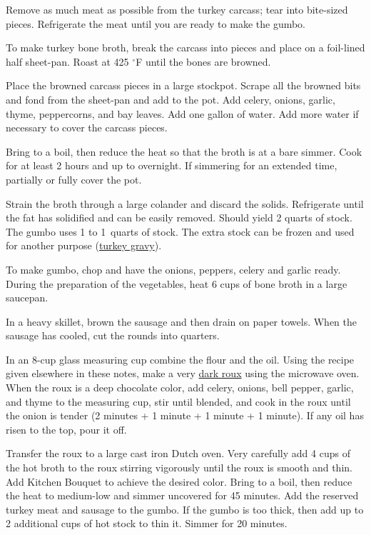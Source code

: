 \documentclass[letterpaper]{recipePMG}
\renewcommand{\deg}{$^\circ$}
\newcommand{\half}{\nicefrac{1}{2} \,}
\begin{document}
Remove as much meat as possible from the turkey carcass; tear into bite-sized pieces. Refrigerate the meat until you are ready to make the gumbo.

To make turkey bone broth, break the carcass into pieces and place on a foil-lined half sheet-pan. Roast at 425 \deg F until the bones are browned.

Place the browned carcass pieces in a large stockpot. Scrape all the browned bits and fond from the sheet-pan and add to the pot. Add celery, onions, garlic, thyme, peppercorns, and bay leaves. Add one gallon of water.  Add more water if necessary to cover the carcass pieces. 

Bring to a boil, then reduce the heat so that the broth is at a bare simmer. Cook for at least 2 hours and up to overnight. If simmering for an extended time, partially or fully cover the pot. 

Strain the broth through a large colander and discard the solids. Refrigerate until the fat has solidified and can be easily removed. Should yield 2 quarts of stock.  The gumbo uses 1 to 1\half quarts of stock. The extra stock can be frozen and used for another purpose (\hyperref[TurkeyGravy]{turkey gravy}).

To make gumbo, chop and have the onions, peppers, celery and garlic ready. During the preparation of the vegetables, heat 6 cups of bone broth in a large saucepan. 

In a heavy skillet, brown the sausage and then drain on paper towels. When the sausage has cooled, cut the rounds into quarters.

In an 8-cup glass measuring cup combine the flour and the oil.  Using the recipe given elsewhere in these notes, make a very \hyperref[DarkRoux]{dark roux} using the microwave oven. When the roux is a deep chocolate color, add celery, onions, bell pepper, garlic, and thyme to the measuring cup, stir until blended, and cook in the roux until the onion is tender (2 minutes + 1 minute + 1 minute + 1 minute). If any oil has risen to the top, pour it off.
\newpage

Transfer the roux to a large cast iron Dutch oven. Very carefully add 4 cups of the hot broth to the roux stirring vigorously until the roux is smooth and thin. Add Kitchen Bouquet to achieve the desired color. Bring to a boil, then reduce the heat to medium-low and simmer uncovered for 45 minutes. Add the reserved turkey meat and sausage to the gumbo.  If the gumbo is too thick, then add up to 2 additional cups of hot stock to thin it. Simmer for 20 minutes.
\end{document}
